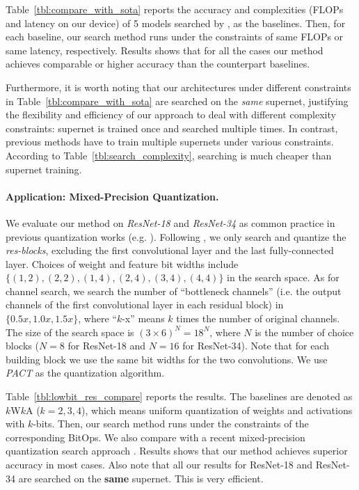 Table~\ref{tbl:compare_with_sota} reports the accuracy and complexities (FLOPs and latency on our device) of 5 models searched by \cite{cai2018proxylessnas,wu2018fbnet}, as the baselines. Then, for each baseline, our search method runs under the constraints of same FLOPs or same latency, respectively. Results shows that for all the cases our method achieves comparable or higher accuracy than the counterpart baselines. 

Furthermore, it is worth noting that our architectures under different constraints in Table~\ref{tbl:compare_with_sota} are searched on the \emph{same} supernet, justifying the flexibility and efficiency of our approach to deal with different complexity constraints: supernet is trained once and searched multiple times. In contrast, previous methods \cite{wu2018fbnet,cai2018proxylessnas} have to train multiple supernets under various constraints. According to Table~\ref{tbl:search_complexity}, searching is much cheaper than supernet training. 

\paragraph{Application: Mixed-Precision Quantization. } We evaluate our method on \emph{ResNet-18} and \emph{ResNet-34} as common practice in previous quantization works (e.g. \cite{choi2018pact,wu2018mixed,liu2018bi,zhou2016dorefa,zhang2018lq}). Following \cite{zhou2016dorefa,choi2018pact,wu2018mixed}, we only search and quantize the \emph{res-blocks}, excluding the first convolutional layer and the last fully-connected layer. Choices of weight and feature bit widths include $\{(1,2), (2,2), (1,4), (2,4), (3,4), (4,4)\}$ in the search space. As for channel search, we search the number of ``bottleneck channels'' (i.e. the output channels of the first convolutional layer in each residual block) in $\{0.5x, 1.0x, 1.5x\}$, where ``$k$-x'' means $k$ times the number of original channels. The size of the search space is $(3\times 6)^N=18^N$, where $N$ is the number of choice blocks ($N=8$ for ResNet-18 and $N=16$ for ResNet-34). Note that for each building block we use the same bit widths for the two convolutions. We use \emph{PACT} \cite{choi2018pact} as the quantization algorithm. 

Table~\ref{tbl:lowbit_res_compare} reports the results. The baselines are denoted as $k$W$k$A ($k=2,3,4$), which means uniform quantization of weights and activations with $k$-bits. Then, our search method runs under the constraints of the corresponding BitOps. We also compare with a recent mixed-precision quantization search approach \cite{wu2018mixed}. Results shows that our method achieves superior accuracy in most cases. Also note that all our results for ResNet-18 and ResNet-34 are searched on the \textbf{same} supernet. This is very efficient.

